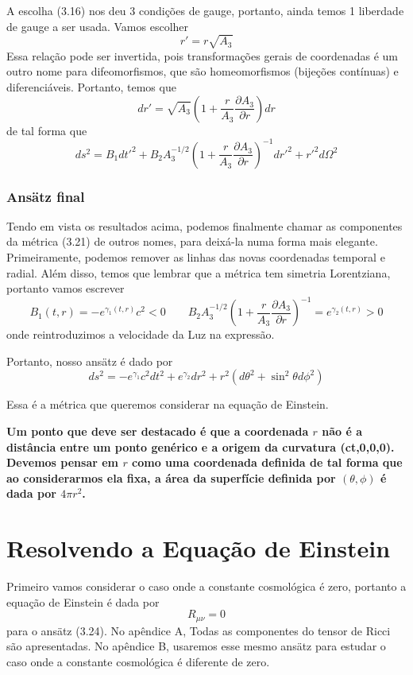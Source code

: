 \documentclass[11pt]{article}
\begin{document}
A escolha (3.16) nos deu 3 condições de gauge, portanto, ainda temos 1
liberdade de gauge a ser usada. Vamos escolher
\[ \tag{3.20} r' = r\sqrt{A_3} \] Essa relação pode ser invertida, pois
transformações gerais de coordenadas é um outro nome para
difeomorfismos, que são homeomorfismos (bijeções contínuas) e
diferenciáveis. Portanto, temos que
\[ \tag{3.21} dr' = \sqrt{A_3}\left(1 + \frac{r}{A_3}\frac{\partial A_3}{\partial r} \right) dr\]
de tal forma que
\[ \tag{3.22} ds^2 = B_1 dt'^2 + B_2 A_3^{-1/2} \left(1 + \frac{r}{A_3}\frac{\partial A_3}{\partial r} \right)^{-1} dr'^2 + r'^2 d \Omega^2  \]

    \hypertarget{ansuxe4tz-final}{%
\subsubsection{Ansätz final}\label{ansuxe4tz-final}}

    Tendo em vista os resultados acima, podemos finalmente chamar as
componentes da métrica (3.21) de outros nomes, para deixá-la numa forma
mais elegante. Primeiramente, podemos remover as linhas das novas
coordenadas temporal e radial. Além disso, temos que lembrar que a
métrica tem simetria Lorentziana, portanto vamos escrever
\[ \tag{3.23} B_1(t,r) = - e^{\gamma_1(t,r)} c^2 < 0 \qquad 
B_2 A_3^{-1/2} \left(1 + \frac{r}{A_3}\frac{\partial A_3}{\partial r} \right)^{-1} = e^{\gamma_2(t,r)} > 0\]
onde reintroduzimos a velocidade da Luz na expressão.

Portanto, nosso ansätz é dado por
\[ \tag{3.24} \boxed{ds^2 = - e^{\gamma_1} c^2 dt^2 + e^{\gamma_2}dr^2 + r^2 (d\theta^2 + \sin^2\theta d\phi^2)}\]

Essa é a métrica que queremos considerar na equação de Einstein.

\textbf{Um ponto que deve ser destacado é que a coordenada \(r\) não é a
distância entre um ponto genérico e a origem da curvatura (ct,0,0,0).
Devemos pensar em \(r\) como uma coordenada definida de tal forma que ao
considerarmos ela fixa, a área da superfície definida por
\((\theta, \phi)\) é dada por \(4 \pi r^2\).}

    \hypertarget{resolvendo-a-equauxe7uxe3o-de-einstein}{%
\section{Resolvendo a Equação de
Einstein}\label{resolvendo-a-equauxe7uxe3o-de-einstein}}

    Primeiro vamos considerar o caso onde a constante cosmológica é zero,
portanto a equação de Einstein é dada por \[ \tag{4.1} R_{\mu\nu} = 0 \]
para o ansätz (3.24). No apêndice A, Todas as componentes do tensor de
Ricci são apresentadas. No apêndice B, usaremos esse mesmo ansätz para
estudar o caso onde a constante cosmológica é diferente de zero.
\end{document}
